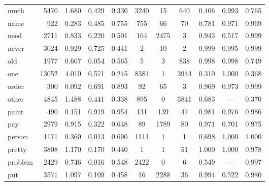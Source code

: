 \begin{landscape}
\begin{longtable}[c]{ l | r r c c | c c c | c c c }
  much       & 5470  & 1.680                   & 0.429           & 0.330      & 3240      & 15          & 640          & 0.406     & 0.993       & 0.765\\
  name       & 922   & 0.283                   & 0.485           & 0.755      & 755       & 66          & 70           & 0.781     & 0.971       & 0.969\\
  need       & 2711  & 0.833                   & 0.220           & 0.501      & 164       & 2475        & 3            & 0.943     & 0.517       & 0.999\\
  never      & 3024  & 0.929                   & 0.725           & 0.441      & 2         & 10          & 2            & 0.999     & 0.995       & 0.999\\
  old        & 1977  & 0.607                   & 0.054           & 0.565      & 5         & 3           & 838          & 0.998     & 0.998       & 0.749\\
  one        & 13052 & 4.010                   & 0.571           & 0.245      & 8384      & 1           & 3944         & 0.310     & 1.000       & 0.368\\
  order      & 300   & 0.092                   & 0.691           & 0.893      & 92        & 65          & 3            & 0.969     & 0.973       & 0.999\\
  other      & 4845  & 1.488                   & 0.441           & 0.338      & 895       & 0           & 3841         & 0.683     & —           & 0.370\\
  paint      & 490   & 0.151                   & 0.919           & 0.954      & 131       & 139         & 47           & 0.981     & 0.976       & 0.986\\
  pay        & 2979  & 0.915                   & 0.322           & 0.648      & 89        & 1789        & 80           & 0.971     & 0.701       & 0.975\\
  person     & 1171  & 0.360                   & 0.013           & 0.690      & 1111      & 1           & 1            & 0.698     & 1.000       & 1.000\\
  pretty     & 3808  & 1.170                   & 0.170           & 0.440      & 1         & 1           & 51           & 1.000     & 1.000       & 0.978\\
  problem    & 2429  & 0.746                   & 0.016           & 0.548      & 2422      & 0           & 6            & 0.549     & —           & 0.997\\
  put        & 3571  & 1.097                   & 0.109           & 0.458      & 16        & 2288        & 36           & 0.994     & 0.522       & 0.980\\

\end{longtable}
\end{landscape}

